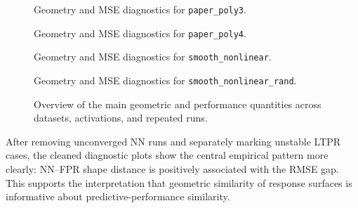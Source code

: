 \documentclass[]{interact}
\theoremstyle{plain}
\theoremstyle{definition}
\theoremstyle{remark}
\begin{document}
\begin{figure}[htbp]
\centering
{}
\hfill
{}
\caption{Geometry and MSE diagnostics for \texttt{paper\_poly3}.}
\label{fig:paper-poly3-diagnostics}
\end{figure}

\begin{figure}[htbp]
\centering
{}
\hfill
{}
\caption{Geometry and MSE diagnostics for \texttt{paper\_poly4}.}
\label{fig:paper-poly4-diagnostics}
\end{figure}

\begin{figure}[htbp]
\centering
{}
\hfill
{}
\caption{Geometry and MSE diagnostics for \texttt{smooth\_nonlinear}.}
\label{fig:smooth-nonlinear-diagnostics}
\end{figure}

\begin{figure}[htbp]
\centering
{}
\hfill
{}
\caption{Geometry and MSE diagnostics for \texttt{smooth\_nonlinear\_rand}.}
\label{fig:smooth-nonlinear-rand-diagnostics}
\end{figure}

\begin{figure}[htbp]
\centering
{}
\caption{Overview of the main geometric and performance quantities across
datasets, activations, and repeated runs.}
\label{fig:overview-boxplot}
\end{figure}

\FloatBarrier

After removing unconverged NN runs and separately marking unstable LTPR cases,
the cleaned diagnostic plots show the central empirical pattern more clearly:
NN--FPR shape distance is positively associated with the RMSE gap. This supports
the interpretation that geometric similarity of response surfaces is informative
about predictive-performance similarity.
\end{document}

